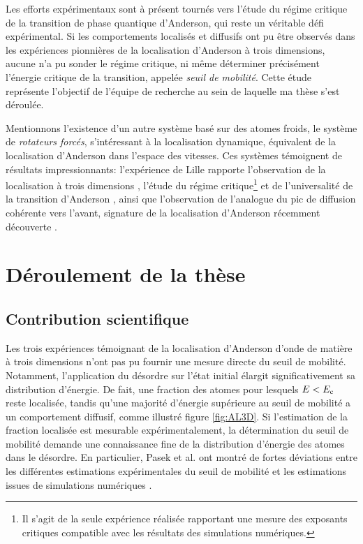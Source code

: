 Les efforts expérimentaux sont à présent tournés vers l'étude du régime critique de la transition de phase quantique d'Anderson, qui reste un véritable défi expérimental. Si les comportements localisés et diffusifs ont pu être observés dans les expériences pionnières de la localisation d'Anderson à trois dimensions, aucune n'a pu sonder le régime critique, ni même déterminer précisément l'énergie critique de la transition, appelée \emph{seuil de mobilité}. Cette étude représente l'objectif de l'équipe de recherche au sein de laquelle ma thèse s'est déroulée.

Mentionnons l'existence d'un autre système basé sur des atomes froids, le système de \emph{rotateurs forcés}, s'intéressant à la localisation dynamique, équivalent de la localisation d'Anderson dans l'espace des vitesses. Ces systèmes témoignent de résultats impressionnants: l'expérience de Lille rapporte l'observation de la localisation à trois dimensions \citep{chabe2008experimental}, l'étude du régime critique\footnote{Il s'agit de la seule expérience réalisée rapportant une mesure des exposants critiques compatible avec les résultats des simulations numériques.} et de l'universalité de la transition d'Anderson \citep{lopez2012experimental}, ainsi que l'observation de l'analogue du pic de diffusion cohérente vers l'avant, signature de la localisation d'Anderson récemment découverte \citep{hainaut2018controlling}.


\section{Déroulement de la thèse}

\subsection{Contribution scientifique}
Les trois expériences témoignant de la localisation d'Anderson d'onde de matière à trois dimensions n'ont pas pu fournir une mesure directe du seuil de mobilité. Notamment, l'application du désordre sur l'état initial élargit significativement sa distribution d'énergie. De fait, une fraction des atomes pour lesquels $E<E_{\mathrm{c}}$ reste localisée, tandis qu'une majorité d'énergie supérieure au seuil de mobilité a un comportement diffusif, comme illustré figure \ref{fig:AL3D}. Si l'estimation de la fraction localisée est mesurable expérimentalement, la détermination du seuil de mobilité demande une connaissance fine de la distribution d'énergie des atomes dans le désordre. En particulier, Pasek et al. ont montré de fortes déviations entre les différentes estimations expérimentales du seuil de mobilité et les estimations issues de simulations numériques \citep{pasek2017anderson}.

